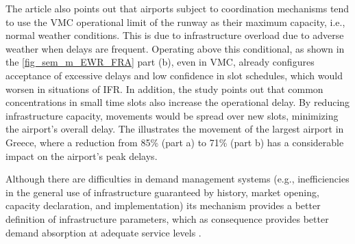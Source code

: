 The article \cite{cavusoglu2021minimum} also points out that airports subject to coordination mechanisms tend to use the \acrfull{VMC} operational limit of the runway as their maximum capacity, i.e., normal weather conditions. This is due to infrastructure overload due to adverse weather when delays are frequent. Operating above this conditional, as shown in the \ref{fig_sem_m_EWR_FRA} part (b), even in \acrshort{VMC}, already configures acceptance of excessive delays and low confidence in slot schedules, which would worsen in situations of \acrshort{IFR}. In addition, the study \cite{zografos2017increasing} points out that common concentrations in small time slots also increase the operational delay. By reducing infrastructure capacity, movements would be spread over new slots, minimizing the airport's overall delay. The  illustrates the movement of the largest airport in Greece, where a reduction from 85\% (part a) to 71\% (part b) has a considerable impact on the airport's peak delays.

%

Although there are difficulties in demand management systems (e.g., inefficiencies in the general use of infrastructure guaranteed by history, market opening, capacity declaration, and implementation) its mechanism provides a better definition of infrastructure parameters, which as consequence provides better demand absorption at adequate service levels \cite{morisset2011capacity}.